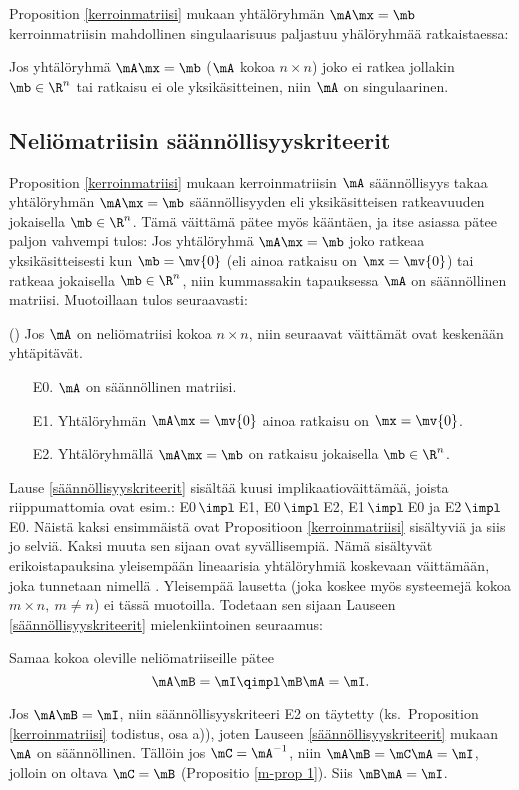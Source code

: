 Proposition \ref{kerroinmatriisi} mukaan yhtälöryhmän $\mA\mx=\mb$ kerroinmatriisin mahdollinen
singulaarisuus paljastuu yhälöryhmää ratkaistaessa:
\begin{Kor} \label{singulaarisuuskriteeri} Jos yhtälöryhmä $\mA\mx=\mb$ 
($\mA$ kokoa $n \times n$) joko ei ratkea jollakin $\mb\in\R^n$ tai ratkaisu ei ole
yksikäsitteinen, niin $\mA$ on singulaarinen.
\end{Kor}

\subsection*{Neliömatriisin säännöllisyyskriteerit}

Proposition \ref{kerroinmatriisi} mukaan kerroinmatriisin $\mA$ säännöllisyys takaa
yhtälöryhmän $\mA\mx=\mb$ säännöllisyyden eli yksikäsitteisen ratkeavuuden jokaisella
$\mb\in\R^n$. Tämä väittämä pätee myös kääntäen, ja itse asiassa pätee paljon vahvempi tulos:
Jos yhtälöryhmä $\mA\mx=\mb$ joko ratkeaa yksikäsitteisesti kun $\mb=\mv{0}$ (eli ainoa
ratkaisu on $\mx=\mv{0}$) tai ratkeaa jokaisella $\mb\in\R^n$, niin kummassakin tapauksessa
$\mA$ on säännöllinen matriisi. Muotoillaan tulos seuraavasti:
\begin{*Lause} () \label{säännöllisyyskriteerit}
 Jos $\mA$ on
neliömatriisi kokoa $n \times n$, niin seuraavat väittämät ovat keskenään yhtäpitävät.
\begin{itemize}
\item[E0.] $\mA$ on säännöllinen matriisi.
\item[E1.] Yhtälöryhmän $\mA\mx=\mv{0}$ ainoa ratkaisu on $\mx=\mv{0}$.
\item[E2.] Yhtälöryhmällä $\mA\mx=\mb$ on ratkaisu jokaisella $\mb\in\R^n$.
\end{itemize}
\end{*Lause}
Lause \ref{säännöllisyyskriteerit} sisältää kuusi implikaatioväittämää, joista riippumattomia
ovat esim.: E0\,$\impl$\,E1, E0\,$\impl$\,E2, E1\,$\impl$\,E0 ja E2\,$\impl$\,E0. Näistä 
kaksi ensimmäistä ovat Propositioon \ref{kerroinmatriisi} sisältyviä ja siis jo selviä.
Kaksi muuta sen sijaan ovat syvällisempiä. Nämä sisältyvät erikoistapauksina yleisempään
lineaarisia yhtälöryhmiä koskevaan väittämään, joka tunnetaan nimellä 
. Yleisempää lausetta (joka koskee myös systeemejä kokoa 
$m \times n,\ m \neq n$) ei tässä muotoilla. Todetaan sen sijaan Lauseen
\ref{säännöllisyyskriteerit} mielenkiintoinen seuraamus:
\begin{Kor} \label{ihme} Samaa kokoa oleville neliömatriiseille pätee
\[
\mA\mB=\mI \qimpl \mB\mA=\mI.
\]
\end{Kor}
\tod Jos $\mA\mB=\mI$, niin säännöllisyyskriteeri E2 on täytetty (ks.\ Proposition
\ref{kerroinmatriisi} todistus, osa a)), joten Lauseen \ref{säännöllisyyskriteerit} mukaan
$\mA$ on säännöllinen. Tällöin jos $\mC=\mA^{-1}$, niin $\mA\mB=\mC\mA=\mI$, jolloin on oltava
$\mC=\mB$ (Propositio \ref{m-prop 1}). Siis $\mB\mA=\mI$. \loppu

